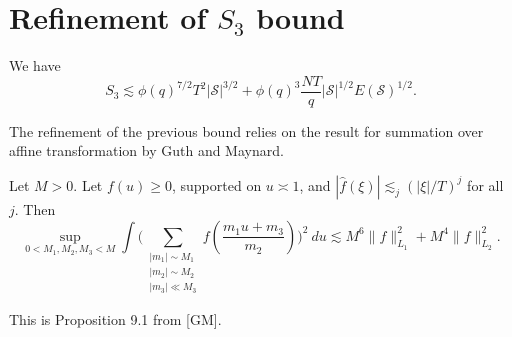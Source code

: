 \section{Refinement of $S_3$ bound}

\begin{proposition}[Refinement of $S_3$]
    \label{refinements_3}
    We have \[
    S_3\lesssim \phi(q)^{7/2}T^2|\mathcal{S}|^{3/2}+\phi(q)^{3}\frac{NT}{q}|\mathcal{S}|^{1/2}E(\mathcal{S})^{1/2}.
     \]
\end{proposition}
The refinement of the previous bound relies on the result for summation over affine transformation by Guth and Maynard.
\begin{lemma}\label{affinetrans}
    Let $M>0$. Let $f(u)\geq 0$, supported on $u\asymp 1$, and $|\hat{f}(\xi)|\lesssim_j (|\xi|/T)^j$ for all $j$. Then \[
        \sup_{0<M_1,M_2,M_3<M} \int\Bigg( \sum_{\substack{|m_1|\sim M_1\\|m_2|\sim M_2 \\ |m_3|\ll M_3}} f\left(\frac{m_1 u+m_3}{m_2}\right)\Bigg)^2 \ du \lesssim M^6 \|f\|_{L_1}^2+M^4\|f\|_{L_2}^2.
    \] 
\end{lemma}
This is Proposition 9.1 from [GM].

